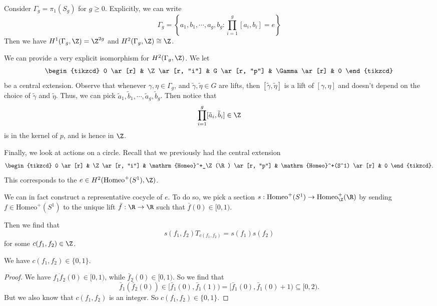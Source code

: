 \documentclass[a4paper]{article}
\newcommand\Homeo{\mathrm{Homeo}}
\begin{document}
\begin{eg}
  Consider $\Gamma_g = \pi_1(S_g)$ for $g \geq 0$. Explicitly, we can write
  \[
    \Gamma_g = \left\{a_1, b_1, \cdots, a_g, b_g : \prod_{i = 1}^g [a_i, b_i] = e\right\}
  \]
  Then we have $H^1(\Gamma_g, \Z) = \Z^{2g}$ and $H^2(\Gamma_g, \Z) \cong \Z$.

  We can provide a very explicit isomorphism for $H^2(\Gamma_g, \Z)$. We let
  \[
    \begin{tikzcd}
      0 \ar[r] & \Z \ar[r, "i"] & G \ar[r, "p"] & \Gamma \ar[r] & 0
    \end{tikzcd}
  \]
  be a central extension. Observe that whenever $\gamma, \eta \in \Gamma_g$, and  $\tilde{\gamma}, \tilde{\eta} \in G$ are lifts, then $[\tilde{\gamma}, \tilde{\eta}]$ is a lift of $[\gamma, \eta]$ and doesn't depend on the choice of $\tilde{\gamma}$ and $\tilde{\eta}$. Thus, we can pick $\tilde{a}_1, \tilde{b}_1, \cdots, \tilde{a}_g, \tilde{b}_g$. Then notice that
  \[
    \prod_{i = 1}^g [\tilde{a}_i, \tilde{b}_i] \in \Z
  \]
  is in the kernel of $p$, and is hence in $\Z$.
\end{eg}

Finally, we look at actions on a circle. Recall that we previously had the central extension
\[
  \begin{tikzcd}
    0 \ar[r] & \Z \ar[r, "i"] & \Homeo^+_\Z(\R) \ar[r, "p"] & \Homeo^+(S^1) \ar[r] & 0
  \end{tikzcd}.
\]
This corresponds to the  $e \in H^2(\Homeo^+(S^1), \Z)$.

We can in fact construct a representative cocycle of $e$. To do so, we pick a section $s: \Homeo^+(S^1) \to \Homeo_\Z^+(\R)$ by sending $f \in \Homeo^+(S^1)$ to the unique lift $\bar{f}: \R \to \R$ such that $\bar{f}(0) \in [0, 1)$.

Then we find that
\[
  s(f_1, f_2) T_{c(f_1, f_2)} = s(f_1) s(f_2)
\]
for some $c(f_1, f_2) \in \Z$.

\begin{lemma}
  We have $c(f_1, f_2) \in \{0, 1\}$.
\end{lemma}

\begin{proof}
  We have $\overline{f_1 f_2}(0) \in [0, 1)$, while $\bar{f}_2(0) \in [0, 1)$. So we find that
  \[
    \bar{f}_1(\bar{f}_2(0)) \in [\bar{f}_1(0), \bar{f}_1(1)) = [\bar{f}_1(0), \bar{f}_1(0) + 1) \subseteq [0, 2).
  \]
  But we also know that $c(f_1, f_2)$ is an integer. So $c(f_1, f_2) \in \{0, 1\}$.
\end{proof}
\end{document}
